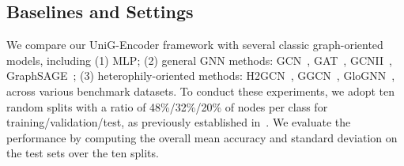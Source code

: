 \documentclass[review]{elsarticle}
\begin{document}
\begin{table}[htbp]
  \centering
  \caption{\textbf{Statistics of twelve hypergraph datasets.}}
  \label{table:stat hyper}
\end{table}

\subsection{Baselines and Settings}

We compare our UniG-Encoder framework with several classic graph-oriented models, including (1) MLP; (2) general GNN methods: GCN~\cite{kipf2016semi}, GAT~\cite{velickovic2017graph}, GCNII~\cite{chen2020simple}, GraphSAGE~\cite{hamilton2017inductive}; (3) heterophily-oriented methods: H2GCN~\cite{zhu2020beyond}, GGCN~\cite{yan2022two}, GloGNN~\cite{li2022finding}, across various benchmark datasets. To conduct these experiments, we adopt ten random splits with a ratio of 48\%/32\%/20\% of nodes per class for training/validation/test, as previously established in~\cite{li2022finding}. We evaluate the performance by computing the overall mean accuracy and standard deviation on the test sets over the ten splits.
\end{document}

